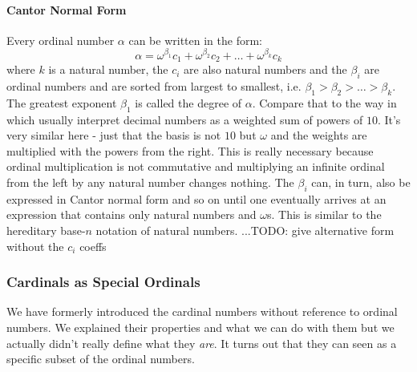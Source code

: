 





\paragraph{Cantor Normal Form}
Every ordinal number $\alpha$ can be written in the form:
\begin{equation}
\alpha = \omega^{\beta_1} c_1 + \omega^{\beta_2} c_2 + \ldots + \omega^{\beta_k} c_k
\end{equation}
where $k$ is a natural number, the $c_i$ are also natural numbers and the $\beta_i$ are ordinal numbers and are sorted from largest to smallest, i.e. $\beta_1 > \beta_2 > \ldots > \beta_k$. The greatest exponent $\beta_1$ is called the degree of $\alpha$. Compare that to the way in which usually interpret decimal numbers as a weighted sum of powers of $10$. It's very similar here - just that the basis is not $10$ but $\omega$ and the weights are multiplied with the powers from the right. This is really necessary because ordinal multiplication is not commutative and multiplying an infinite ordinal from the left by any natural number changes nothing. The $\beta_i$ can, in turn, also be expressed in Cantor normal form and so on until one eventually arrives at an expression that contains only natural numbers and $\omega$s. This is similar to the hereditary base-$n$ notation of natural numbers. ...TODO: give alternative form without the $c_i$ coeffs





\subsubsection{Cardinals as Special Ordinals}
We have formerly introduced the cardinal numbers without reference to ordinal numbers. We explained their properties and what we can do with them but we actually didn't really define what they \emph{are}. It turns out that they can seen as a specific subset of the ordinal numbers.

